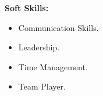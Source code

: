 \documentclass[a4paper,11pt]{article}
\begin{document}
\begin{minipage}[t]{0.4\textwidth}
			\raggedright\smallskip
			\begin{LARGE}
				 \textbf{Soft Skills:}\medskip%
				{\small
					\begin{itemize}
						\item {Communication Skills.}
						\item {Leadership.}
						\item {Time Management.}
						\item {Team Player.}
					\end{itemize}
				}
				
			\end{LARGE}
			\vspace{0.5cm}	

\end{minipage}%
\hspace{0.6cm}
\end{document}
